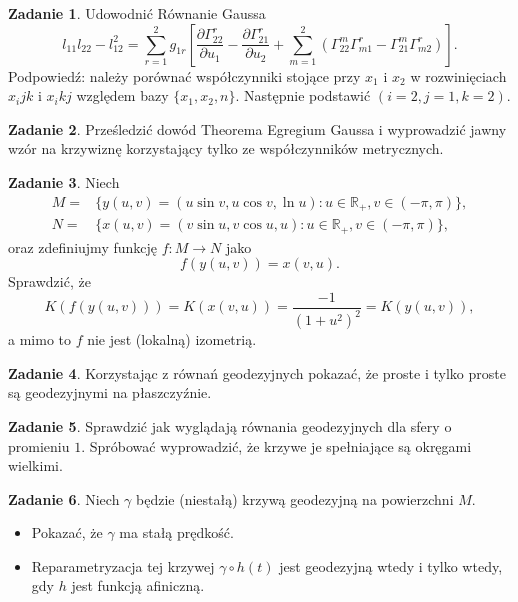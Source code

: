 \documentclass[a4paper,11pt]{article}
\theoremstyle{definition}\newtheorem{exercise}{Zadanie}
\theoremstyle{definition}\newtheorem{remark}{Uwaga}
\begin{document}
\begin{exercise}
 Udowodnić R\'ownanie Gaussa
 \begin{equation*}
l_{11}l_{22}-l_{12}^2=
\sum_{r=1}^{2}g_{1r}
\left[
\frac{\partial \Gamma^r_{22}} {\partial u_{1}}- \frac{\partial\Gamma 
^r_{21}}{\partial u_{2}}+
\sum_{m=1}^2 
\left(\Gamma^m_{22}\Gamma^r_{m1}-\Gamma^m_{21}\Gamma^r_{m2}\right)\right].
\end{equation*}
\footnotesize{Podpowiedź: należy porównać współczynniki stojące przy $x_1$ i 
$x_2$ w rozwinięciach $x_ijk$ i $x_ikj$ względem bazy 
$\{x_1,x_2,n\}$. Następnie podstawić $(i=2,j=1,k=2)$.}

\end{exercise}

\begin{exercise}
 Prześledzić dow\'od Theorema Egregium Gaussa i wyprowadzić jawny wz\'or na 
krzywiznę korzystający tylko ze wsp\'ołczynnik\'ow metrycznych.
\end{exercise}

\begin{exercise}
Niech 
\begin{align*}
M=&\{y(u,v)=(u \sin v, u\cos v,\ln u)\colon u\in \mathbb{R}_+, v\in 
(-\pi,\pi)\},\\
N=&\{x(u,v)=(v \sin u, v\cos u, u)\colon u\in \mathbb{R}_+, v\in (-\pi,\pi)\},
\end{align*}
oraz zdefiniujmy funkcję $f\colon M\to N$ jako \[f(y(u,v))= x(v,u).\]
Sprawdzić, że 
\[K\left( f(y(u,v))\right)=K(x(v,u))=\frac{-1}{(1+u^2)^2}=K(y(u,v)),\]
a mimo to $f$ nie jest (lokalną) izometrią.
\end{exercise}

\begin{exercise}
 Korzystając z r\'ownań geodezyjnych pokazać, że proste i tylko proste są 
geodezyjnymi na płaszczyźnie.
\end{exercise}

\begin{exercise}
 Sprawdzić jak wyglądają r\'ownania geodezyjnych dla sfery o promieniu $1$. 
Spr\'obować wyprowadzić, że krzywe je spełniające są okręgami wielkimi.
\end{exercise}



\begin{exercise}
Niech $\gamma$ będzie (niestałą) krzywą geodezyjną na powierzchni $M$. 
\begin{itemize}
 \item Pokazać, że $\gamma$ ma stałą prędkość.
 \item Reparametryzacja tej krzywej $\gamma\circ h (t)$ jest geodezyjną wtedy i 
tylko wtedy, gdy $h$ jest funkcją afiniczną. 
\end{itemize}

\end{exercise}
\end{document}
